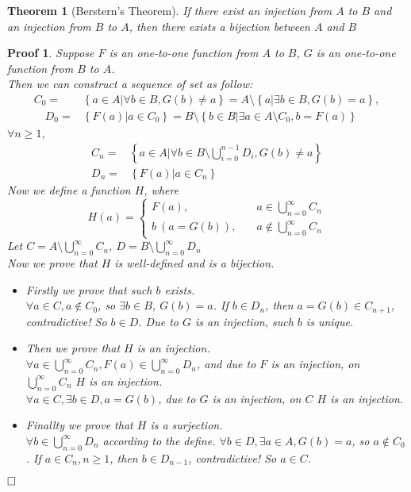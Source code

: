 \documentclass{ctexart}
\newcommand{\。}{．} %
\newenvironment{lanse}{
    \begin{tcolorbox}[enhanced, breakable, colback=qlan, boxrule=0pt, frame hidden,
        borderline west={0.7mm}{0.1mm}{slan}]
    }
    {\end{tcolorbox}}
\newenvironment{huangse}{
    \begin{tcolorbox}[enhanced, breakable, colback=qhuang, boxrule=0pt, frame hidden,
        borderline west={0.7mm}{0.1mm}{shuang}]
    }
    {\end{tcolorbox}}
\theoremstyle{t} %
\newtheorem{dlhj}{\color{shuang} Theorem}[subsection]
\newtheorem*{zmhj}{\color{slan} Proof}
\newenvironment{zm}{\begin{lanse}\begin{zmhj}}{$\hfill \square$\end{zmhj}\end{lanse}}
\newenvironment{dl}{\begin{huangse}\begin{dlhj}}{\end{dlhj}\end{huangse}}
\begin{document}
\begin{dl}[Berstern's Theorem]
    If there exist an injection from $A$ to $B$ and an injection from $B$ to $A$, then there exists a bijection between $A$ and $B$
\end{dl}

\begin{zm}
    Suppose $F$ is an one-to-one function from $A$ to $B$, $G$ is an one-to-one function from $B$ to $A$. \\
    Then we can construct a sequence of set as follow:
    \begin{align*}
        C_0 =& \left\{a \in A | \forall b \in B, G(b) \neq a\right\} = A \setminus \left\{a | \exists b \in B, G(b) = a\right\}, \\
        \quad D_0 =& \left\{F(a) | a \in C_0\right\} =B \setminus \left\{b \in B | \exists a \in A \setminus C_0 , b = F(a) \right\}
    \end{align*}
    $\forall n \geqslant 1$,
    \begin{align*}
        C_n =& \left\{a \in A \vert \forall b \in B \setminus \bigcup_{i = 0}^{n - 1}D_i, G(b) \neq a\right\} \\
        D_n =& \left\{F(a) \vert a \in C_n \right\} 
    \end{align*}
    Now we define a function $H$, where \\
    \[H(a) = \begin{cases}
        F(a), & \quad a \in \bigcup_{n = 0}^{\infty}C_n \\
        b\ (a = G(b)), & \quad a \notin \bigcup_{n = 0}^{\infty}C_n
    \end{cases}\]
    Let $C = A \setminus \bigcup_{n = 0}^{\infty}C_n$, $D = B \setminus \bigcup_{n = 0}^{\infty}D_n$ \\
    Now we prove that $H$ is well-defined and is a bijection.
    \begin{itemize}
        \item Firstly we prove that such $b$ exists. \\
        $\forall a \in C, a \notin C_0$, so $\exists b \in B$, $G(b) = a$. If $b \in D_n$, then $a = G(b) \in C_{n + 1}$, contradictive! So $b \in D$. Due to $G$ is an injection, such $b$ is unique.
        \item Then we prove that $H$ is an injection. \\
        $\forall a \in \bigcup_{n = 0}^{\infty}C_n, F(a) \in \bigcup_{n = 0}^{\infty}D_n$, and due to $F$ is an injection, on $\bigcup_{n = 0}^{\infty}C_n$ $H$ is an injection. \\
        $\forall a \in C, \exists b \in D, a = G(b)$, due to $G$ is an injection, on $C$ $H$ is an injection. 
        \item Finallty we prove that $H$ is a surjection. \\
        $\forall b \in \bigcup_{n = 0}^{\infty}D_n$ according to the define. $\forall b \in D, \exists a \in A, G(b) = a$, so $a \notin C_0$. If $a \in C_n, n \geqslant 1$, then $b \in D_{n - 1}$, contradictive! So $a \in C$.
    \end{itemize}
\end{zm}
\end{document}
